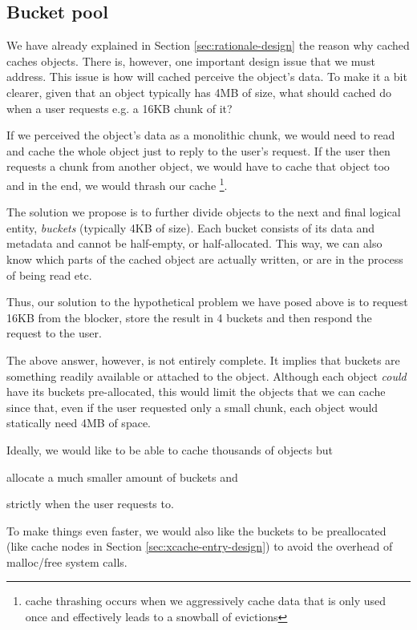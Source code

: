 \subsection{Bucket pool}


We have already explained in Section \ref{sec:rationale-design} the reason why 
cached caches objects. There is, however, one important design issue that we 
must address. This issue is how will cached perceive the object's data. To make 
it a bit clearer, given that an object typically has 4MB of size, what should 
cached do when a user requests e.g. a 16KB chunk of it?

If we perceived the object's data as a monolithic chunk, we would need to read 
and cache the whole object just to reply to the user's request. If the user 
then requests a chunk from another object, we would have to cache that object 
too and in the end, we would thrash our cache
\footnote{
	cache thrashing occurs when we aggressively cache data that is only 
	used once and effectively leads to a snowball of evictions
}.

The solution we propose is to further divide objects to the next and final 
logical entity, \emph{buckets} (typically 4KB of size). Each bucket consists of 
its data and metadata and cannot be half-empty, or half-allocated. This way, we 
can also know which parts of the cached object are actually written, or are in 
the process of being read etc.

Thus, our solution to the hypothetical problem we have posed above is to 
request 16KB from the blocker, store the result in 4 buckets and then respond 
the request to the user.

The above answer, however, is not entirely complete. It implies that buckets 
are something readily available or attached to the object. Although each object 
\textit{could} have its buckets pre-allocated, this would limit the objects 
that we can cache since that, even if the user requested only a small chunk, 
each object would statically need 4MB of space.

Ideally, we would like to be able to cache thousands of objects but
\begin{inparaenum}[i)]
\item allocate a much smaller amount of buckets and
\item strictly when the user requests to.
\end{inparaenum}
To make things even faster, we would also like the buckets to be preallocated 
(like cache nodes in Section \ref{sec:xcache-entry-design}) to avoid the 
overhead of malloc/free system calls.

